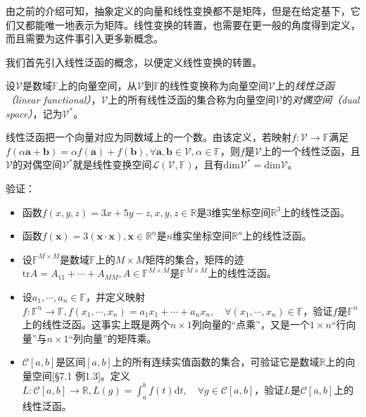 \documentclass[main.tex]{subfiles}
\begin{document}
由之前的介绍可知，抽象定义的向量和线性变换都不是矩阵，但是在给定基下，它们又都能唯一地表示为矩阵。线性变换的转置，也需要在更一般的角度得到定义，而且需要为这件事引入更多新概念。

我们首先引入线性泛函的概念，以便定义线性变换的转置。

\begin{definition}[线性泛函与对偶空间]\label{def:II.4.4}
    设$\mathcal{V}$是数域$\mathbb{F}$上的向量空间，从$\mathcal{V}$到$\mathbb{F}$的线性变换称为向量空间$\mathcal{V}$上的\emph{线性泛函（linear functional）}，$\mathcal{V}$上的所有线性泛函的集合称为向量空间$\mathcal{V}$的\emph{对偶空间（dual space）}，记为$\mathcal{V}^*$。
\end{definition}

线性泛函把一个向量对应为同数域上的一个数。由该定义，若映射$f:\mathcal{V}\rightarrow\mathbb{F}$满足$f\left(\alpha\mathbf{a}+\mathbf{b}\right)=\alpha f\left(\mathbf{a}\right)+f\left(\mathbf{b}\right),\forall\mathbf{a},\mathbf{b}\in\mathcal{V},\alpha\in\mathbb{F}$，则$f$是$\mathcal{V}$上的一个线性泛函，且$\mathcal{V}$的对偶空间$\mathcal{V}^*$就是线性变换空间$\mathcal{L}\left(\mathcal{V},\mathbb{F}\right)$，且有$\mathrm{dim}\mathcal{V}^*=\mathrm{dim}\mathcal{V}$。

\begin{example}\label{exp:II.2.11}
    验证：
    \begin{itemize}
        \item 函数$f\left(x,y,z\right)=3x+5y-z,x,y,z\in\mathbb{R}$是3维实坐标空间$\mathbb{R}^3$上的线性泛函。
        \item 函数$f\left(\mathbf{x}\right)=3\left(\mathbf{x}\cdot\mathbf{x}\right),\mathbf{x}\in\mathbb{R}^n$是$n$维实坐标空间$\mathbb{R}^n$上的线性泛函。
        \item 设$\mathbb{F}^{M\times M}$是数域$\mathbb{F}$上的$M\times M$矩阵的集合，矩阵的迹$\mathrm{tr}A=A_{11}+\cdots+A_{MM},A\in\mathbb{F}^{M\times M}$是$\mathbb{F}^{M\times M}$上的线性泛函。
        \item 设$a_1,\cdots,a_n\in\mathbb{F}$，并定义映射$f:\mathbb{F}^n\rightarrow\mathbb{F},f\left(x_1,\cdots,x_n\right)=a_1x_1+\cdots+a_nx_n,\quad\forall\left(x_1,\cdots,x_n\right)\in\mathbb{F}$，验证$f$是$\mathbb{F}^n$上的线性泛函。这事实上既是两个$n\times 1$列向量的“点乘”，又是一个$1\times n$“行向量”与$n\times 1$“列向量”的矩阵乘。
        \item $\mathcal{C}\left[a,b\right]$是区间$\left[a,b\right]$上的所有连续实值函数的集合，可验证它是数域$\mathbb{R}$上的向量空间\cite{周胜林2012线性代数}[\S 7.1 例1.3]。定义$L:\mathcal{C}\left[a,b\right]\rightarrow\mathbb{R},L\left(g\right)=\int_a^bf\left(t\right)\mathrm{d}t,\quad\forall g\in\mathcal{C}\left[a,b\right]$，验证$L$是$\mathcal{C}\left[a,b\right]$上的线性泛函。
    \end{itemize}
\end{example}
\end{document}
